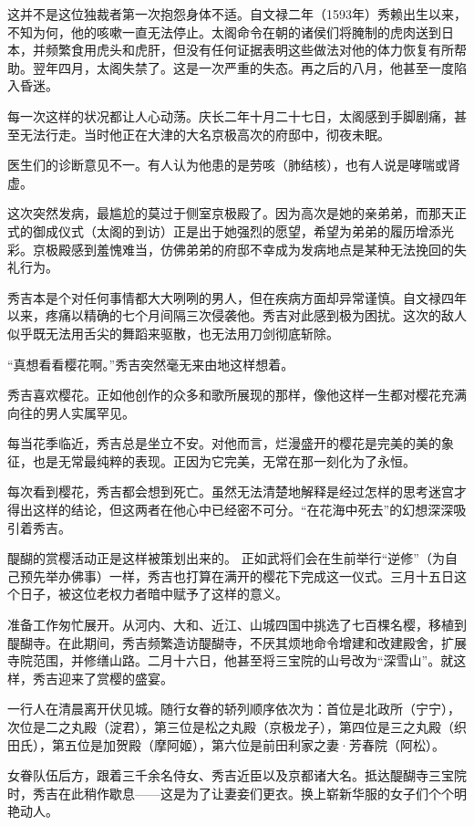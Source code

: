 \documentclass[
]{article}
\begin{document}
这并不是这位独裁者第一次抱怨身体不适。自文禄二年（1593年）秀赖出生以来，不知为何，他的咳嗽一直无法停止。太阁命令在朝的诸侯们将腌制的虎肉送到日本，并频繁食用虎头和虎肝，但没有任何证据表明这些做法对他的体力恢复有所帮助。翌年四月，太阁失禁了。这是一次严重的失态。再之后的八月，他甚至一度陷入昏迷。

每一次这样的状况都让人心动荡。庆长二年十月二十七日，太阁感到手脚剧痛，甚至无法行走。当时他正在大津的大名京极高次的府邸中，彻夜未眠。

医生们的诊断意见不一。有人认为他患的是劳咳（肺结核），也有人说是哮喘或肾虚。

这次突然发病，最尴尬的莫过于侧室京极殿了。因为高次是她的亲弟弟，而那天正式的御成仪式（太阁的到访）正是出于她强烈的愿望，希望为弟弟的履历增添光彩。京极殿感到羞愧难当，仿佛弟弟的府邸不幸成为发病地点是某种无法挽回的失礼行为。

秀吉本是个对任何事情都大大咧咧的男人，但在疾病方面却异常谨慎。自文禄四年以来，疼痛以精确的七个月间隔三次侵袭他。秀吉对此感到极为困扰。这次的敌人似乎既无法用舌尖的舞蹈来驱散，也无法用刀剑彻底斩除。

``真想看看樱花啊。''秀吉突然毫无来由地这样想着。

秀吉喜欢樱花。正如他创作的众多和歌所展现的那样，像他这样一生都对樱花充满向往的男人实属罕见。

每当花季临近，秀吉总是坐立不安。对他而言，烂漫盛开的樱花是完美的美的象征，也是无常最纯粹的表现。正因为它完美，无常在那一刻化为了永恒。

每次看到樱花，秀吉都会想到死亡。虽然无法清楚地解释是经过怎样的思考迷宫才得出这样的结论，但这两者在他心中已经密不可分。``在花海中死去''的幻想深深吸引着秀吉。

醍醐的赏樱活动正是这样被策划出来的。
正如武将们会在生前举行``逆修''（为自己预先举办佛事）一样，秀吉也打算在满开的樱花下完成这一仪式。三月十五日这个日子，被这位老权力者暗中赋予了这样的意义。

准备工作匆忙展开。从河内、大和、近江、山城四国中挑选了七百棵名樱，移植到醍醐寺。在此期间，秀吉频繁造访醍醐寺，不厌其烦地命令增建和改建殿舍，扩展寺院范围，并修缮山路。二月十六日，他甚至将三宝院的山号改为``深雪山''。就这样，秀吉迎来了赏樱的盛宴。

一行人在清晨离开伏见城。随行女眷的轿列顺序依次为：首位是北政所（宁宁），次位是二之丸殿（淀君），第三位是松之丸殿（京极龙子），第四位是三之丸殿（织田氏），第五位是加贺殿（摩阿姬），第六位是前田利家之妻·芳春院（阿松）。

女眷队伍后方，跟着三千余名侍女、秀吉近臣以及京都诸大名。抵达醍醐寺三宝院时，秀吉在此稍作歇息------这是为了让妻妾们更衣。换上崭新华服的女子们个个明艳动人。
\end{document}
